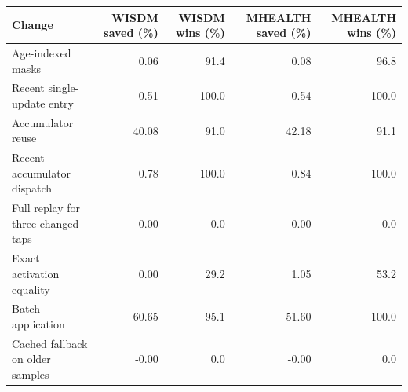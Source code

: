 \begin{tabular}{lrrrr}
\toprule
Change & WISDM saved (\%) & WISDM wins (\%) & MHEALTH saved (\%) & MHEALTH wins (\%) \\
\midrule
Age-indexed masks & 0.06 & 91.4 & 0.08 & 96.8 \\
Recent single-update entry & 0.51 & 100.0 & 0.54 & 100.0 \\
Accumulator reuse & 40.08 & 91.0 & 42.18 & 91.1 \\
Recent accumulator dispatch & 0.78 & 100.0 & 0.84 & 100.0 \\
Full replay for three changed taps & 0.00 & 0.0 & 0.00 & 0.0 \\
Exact activation equality & 0.00 & 29.2 & 1.05 & 53.2 \\
Batch application & 60.65 & 95.1 & 51.60 & 100.0 \\
Cached fallback on older samples & -0.00 & 0.0 & -0.00 & 0.0 \\
\bottomrule
\end{tabular}
